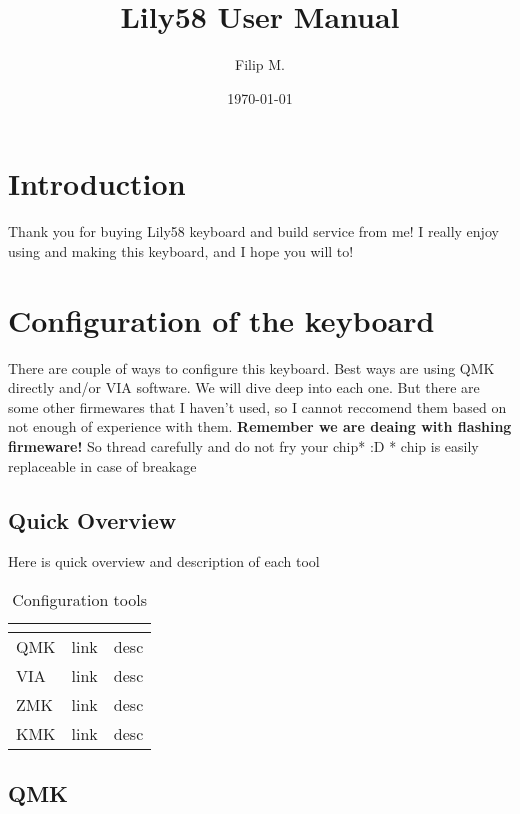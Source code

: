 \documentclass{article}
\title{Lily58 User Manual}
\author{Filip M.}
\date{\today}
\begin{document}
\maketitle

\tableofcontents

\section{Introduction}

Thank you for buying Lily58 keyboard and build service from me!
I really enjoy using and making this keyboard, and I hope you will to!

\section{Configuration of the keyboard}

There are couple of ways to configure this keyboard. Best ways are using QMK directly and/or VIA software.
We will dive deep into each one.
But there are some other firmewares that I haven't used, so I cannot reccomend them based on not enough of experience with them.
\textbf{Remember we are deaing with flashing firmeware!} So thread carefully and do not fry your chip* :D
* chip is easily replaceable in case of breakage

\subsection{Quick Overview}
Here is quick overview and description of each tool
\begin{table}
	\caption{Configuration tools}\label{tab:}
	\begin{center}
		\begin{tabular}[c]{l|l|l}
			\hline
			\multicolumn{1}{c|}{\textbf{}} & 
			\multicolumn{1}{c}{\textbf{}} \\
			\hline
			QMK & link & desc \\
			VIA & link & desc \\
			ZMK & link & desc \\
			KMK & link & desc \\
			
			\hline
		\end{tabular}
	\end{center}
\end{table}

\subsection{QMK}
\end{document}
